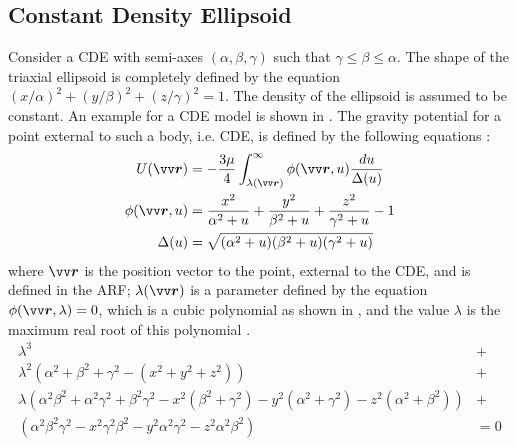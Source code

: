\subsection{Constant Density Ellipsoid}
\label{subsec:constant_density_ellipsoid}
Consider a \gls{CDE} with semi-axes $(\alpha, \beta, \gamma)$ such that $\gamma \leq \beta \leq \alpha$. The shape of the triaxial ellipsoid is completely defined by the equation $(x/\alpha)^2 + (y/\beta)^2 + (z/\gamma)^2 = 1$. The density of the ellipsoid is assumed to be constant. An example for a \gls{CDE} model is shown in .  The gravity potential for a point external to such a body, i.e. \gls{CDE}, is defined by the following equations \parencite{scheeresBook}:
\begin{align}
    U(\bvector{r}) &= -\frac{3\mu}{4} \int_{\lambda(\bvector{r})}^{\infty} \phi(\bvector{r}, u) \frac{du}{\Delta(u)}
    \label{eqn:ellipsoid_potential_short_form} \\
    \phi(\bvector{r}, u) &= \frac{x^2}{\alpha^2 + u} + \frac{y^2}{\beta^2 + u} + \frac{z^2}{\gamma^2 + u} - 1
    \label{eqn:ellipsoid_potential_phi} \\
    \Delta(u) &= \sqrt{(\alpha^2 + u)(\beta^2 + u)(\gamma^2 + u)}
    \label{eqn:ellipsoid_potential_delta}
\end{align}
where $\bvector{r}$ is the position vector to the point, external to the \gls{CDE}, and is defined in the \gls{ARF}; $\lambda(\bvector{r})$ is a parameter defined by the equation $\phi(\bvector{r}, \lambda) = 0$, which is a cubic polynomial as shown in , and the value $\lambda$ is the maximum real root of this polynomial \parencite{scheeresBook}.
\begin{align}
    \lambda^3 &+ \nonumber \\
    \lambda^2 (\alpha^2 + \beta^2 + \gamma^2 - (x^2 + y^2 + z^2)) &+ \nonumber \\
    \lambda (\alpha^2 \beta^2 + \alpha^2 \gamma^2 + \beta^2 \gamma^2 - x^2(\beta^2 + \gamma^2) - y^2(\alpha^2 + \gamma^2) - z^2(\alpha^2 + \beta^2)) &+ \nonumber \\
    (\alpha^2 \beta^2 \gamma^2 - x^2 \gamma^2 \beta^2 - y^2 \alpha^2 \gamma^2 - z^2 \alpha^2 \beta^2) &= 0
    \label{eqn:cubicPolynomial}
\end{align}
